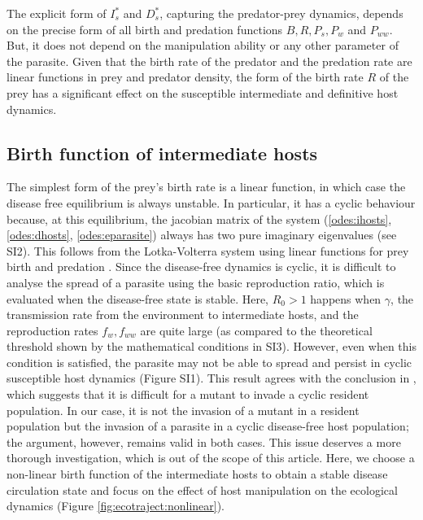 \documentclass[a4paper]{scrartcl}
\begin{document}
The explicit form of $I_s^*$ and $D_s^*$, capturing the predator-prey dynamics, depends on the precise form of all birth and predation functions $B, R, P_s, P_w$ and $P_{ww}$.
But, it does not depend on the manipulation ability or any other parameter of the parasite. 
Given that the birth rate of the predator and the predation rate are linear functions in prey and predator density, the form of the birth rate $R$ of the prey has a significant effect on the susceptible intermediate and definitive host dynamics.

\subsection*{Birth function of intermediate hosts}

The simplest form of the prey's birth rate is a linear function, in which case the disease free equilibrium is always unstable. In particular, it has a cyclic behaviour because, at this equilibrium, the jacobian matrix of the system (\ref{odes:ihosts}, \ref{odes:dhosts}, \ref{odes:eparasite}) always has two pure imaginary eigenvalues (see SI2). 
This follows from the Lotka-Volterra system using linear functions for prey birth and predation \citep{Lotka1920}.
Since the disease-free dynamics is cyclic, it is difficult to analyse the spread of a parasite using the basic reproduction ratio, which is evaluated when the disease-free state is stable. 
Here,  $R_0 > 1$  happens when $\gamma$, the transmission rate from the environment to intermediate hosts, and the reproduction rates $f_w, f_{ww}$ are quite large (as compared to the theoretical threshold shown by the mathematical conditions in SI3). 
However, even when this condition is satisfied, the parasite may not be able to spread and persist in cyclic susceptible host dynamics (Figure SI1). 
This result agrees with the conclusion in \citep{Ripa:Evol:2013}, which suggests that it is difficult for a mutant to invade a cyclic resident population. 
In our case, it is not the invasion of a mutant in a resident population but the invasion of a parasite in a cyclic disease-free host population; the argument, however, remains valid in both cases. 
This issue deserves a more thorough investigation, which is out of the scope of this article. 
Here, we choose a non-linear birth function of the intermediate hosts to obtain a stable disease circulation state and focus on the effect of host manipulation on the ecological dynamics (Figure \ref{fig:ecotraject:nonlinear}). 
\end{document}
